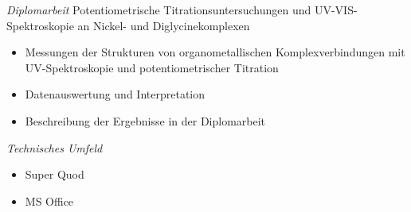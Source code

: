 \documentclass[11pt,a4paper,sans]{moderncv} %
\begin{document}
{
\emph{Diplomarbeit \newline} 
\newline \newline Potentiometrische Titrationsuntersuchungen und UV-VIS-Spektroskopie an Nickel- und Diglycinekomplexen
\newline
\begin{itemize}
	\item Messungen der Strukturen von organometallischen Komplexverbindungen mit UV-Spektroskopie und potentiometrischer Titration  
	\item Datenauswertung und Interpretation 
	\item Beschreibung der Ergebnisse in der Diplomarbeit \newline    
\end{itemize} 
\emph{Technisches Umfeld \newline}
\begin{itemize}
	\item Super Quod 
	\item MS Office 
\end{itemize}
}  
\end{document}
